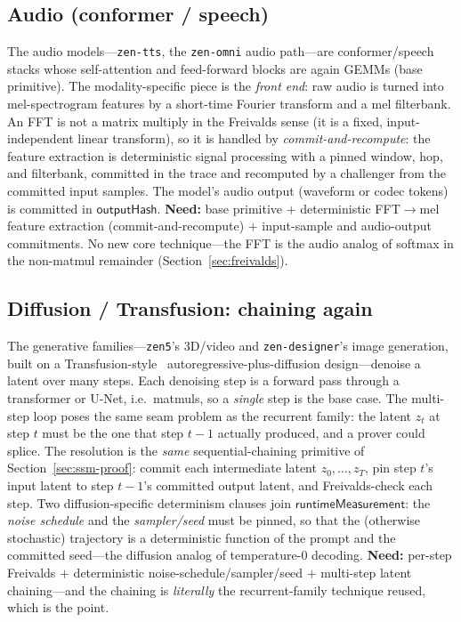 \subsection{Audio (conformer / speech)}
\label{sec:audio}

The audio models---\texttt{zen-tts}, the \texttt{zen-omni} audio path---are conformer/speech
stacks whose self-attention and feed-forward blocks are again GEMMs (base primitive). The
modality-specific piece is the \emph{front end}: raw audio is turned into mel-spectrogram
features by a short-time Fourier transform and a mel filterbank. An FFT is not a matrix
multiply in the Freivalds sense (it is a fixed, input-independent linear transform), so it
is handled by \emph{commit-and-recompute}: the feature extraction is deterministic signal
processing with a pinned window, hop, and filterbank, committed in the trace and recomputed
by a challenger from the committed input samples. The model's audio output (waveform or
codec tokens) is committed in $\mathsf{outputHash}$. \textbf{Need:} base primitive $+$
deterministic FFT$\to$mel feature extraction (commit-and-recompute) $+$ input-sample and
audio-output commitments. No new core technique---the FFT is the audio analog of softmax in
the non-matmul remainder (Section~\ref{sec:freivalds}).

\subsection{Diffusion / Transfusion: chaining again}
\label{sec:diffusion}

The generative families---\texttt{zen5}'s 3D/video and \texttt{zen-designer}'s image
generation, built on a Transfusion-style~\cite{zhou2024transfusion}
autoregressive-plus-diffusion design---denoise a latent over many steps. Each denoising step is a forward pass through a transformer or
U-Net, i.e.\ matmuls, so a \emph{single} step is the base case. The multi-step loop poses
the same seam problem as the recurrent family: the latent $z_t$ at step $t$ must be the one
that step $t-1$ actually produced, and a prover could splice. The resolution is the
\emph{same} sequential-chaining primitive of Section~\ref{sec:ssm-proof}: commit each
intermediate latent $z_0, \ldots, z_T$, pin step $t$'s input latent to step $t-1$'s
committed output latent, and Freivalds-check each step. Two diffusion-specific determinism
clauses join $\mathsf{runtimeMeasurement}$: the \emph{noise schedule} and the
\emph{sampler/seed} must be pinned, so that the (otherwise stochastic) trajectory is a
deterministic function of the prompt and the committed seed---the diffusion analog of
temperature-$0$ decoding. \textbf{Need:} per-step Freivalds $+$ deterministic
noise-schedule/sampler/seed $+$ multi-step latent chaining---and the chaining is
\emph{literally} the recurrent-family technique reused, which is the point.

